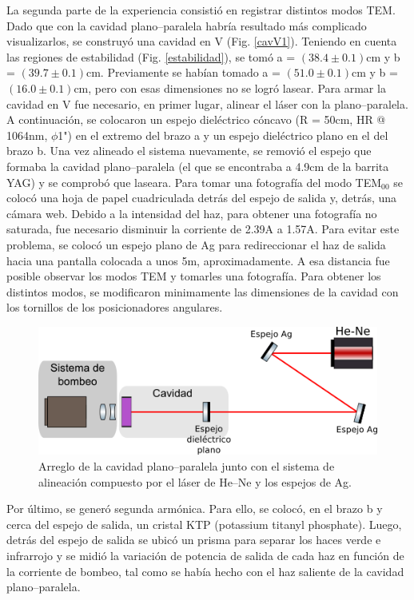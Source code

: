 \documentclass[10pt, a4paper]{article}%
\begin{document}
\begin{multicols}{2}
La segunda parte de la experiencia consistió en registrar distintos modos TEM. Dado que con la cavidad plano--paralela habría resultado más complicado visualizarlos, se construyó una cavidad en V (Fig. \ref{cavV1}). Teniendo en cuenta las regiones de estabilidad (Fig. \ref{estabilidad}), se tomó a = $(38.4 \pm 0.1)$cm y b = $(39.7 \pm 0.1)$cm. Previamente se habían tomado a = $(51.0 \pm 0.1)$cm y b = $(16.0 \pm 0.1)$cm, pero con esas dimensiones no se logró lasear. Para armar la cavidad en V fue necesario, en primer lugar, alinear el láser con la plano--paralela. A continuación, se colocaron un espejo dieléctrico cóncavo  (R = 50cm, HR @ 1064nm, $\phi$1") en el extremo del brazo a y un espejo dieléctrico plano en el del brazo b. Una vez alineado el sistema nuevamente, se removió el espejo que formaba la cavidad plano--paralela (el que se encontraba a 4.9cm de la barrita YAG) y se comprobó que laseara.
Para tomar una fotografía del modo TEM$_{00}$ se colocó una hoja de papel cuadriculada detrás del espejo de salida y, detrás, una cámara web. Debido a la intensidad del haz, para obtener una fotografía no saturada, fue necesario disminuir la corriente de 2.39A a 1.57A. Para evitar este problema, se colocó un espejo plano de Ag para redireccionar el haz de salida hacia una pantalla colocada a unos 5m, aproximadamente. A esa distancia fue posible observar los modos TEM y tomarles una fotografía. Para obtener los distintos modos, se modificaron minimamente las dimensiones de la cavidad con los tornillos de los posicionadores angulares. 


\begin{figure}[H]
    \centering
    \includegraphics[scale=0.5]{Graficos/cavplana.png}
    \caption{Arreglo de la cavidad plano--paralela junto con el sistema de alineación compuesto por el láser de He--Ne y los espejos de Ag.}
    \label{cavplana}
\end{figure}


Por último, se generó segunda armónica. Para ello, se colocó, en el brazo b y cerca del espejo de salida, un cristal KTP (potassium titanyl phosphate). Luego, detrás del espejo de salida se ubicó un prisma para separar los haces verde e infrarrojo y se midió la variación de potencia de salida de cada haz en función de la corriente de bombeo, tal como se había hecho con el haz saliente de la cavidad plano--paralela.   








\end{multicols}
\end{document}
